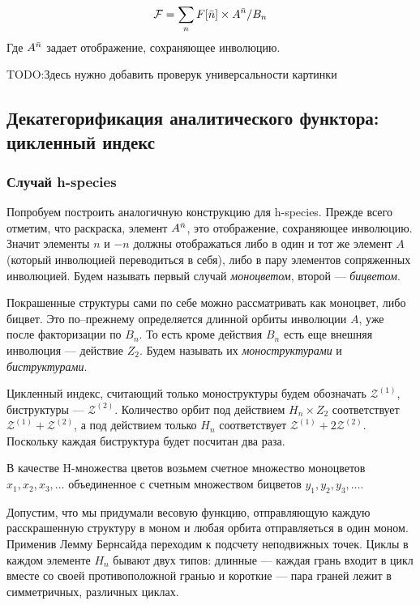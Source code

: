 \begin{equation}
\label{eq:h-an}
	\mathcal F = \sum\limits_n F[\Bar n] \times A^{\Bar n} / B_n
\end{equation}
Где $A^{\Bar n}$ задает отображение, сохраняющее инволюцию. 

TODO:Здесь нужно добавить проверук универсальности картинки

\subsection{Декатегорификация аналитического функтора: цикленный индекс} 

\subsubsection{Случай h-species}
Попробуем построить аналогичную конструкцию для h-species.
Прежде всего отметим, что раскраска, элемент $A^{\Bar n}$, это отображение,
сохраняющее инволюцию. Значит элементы $n$ и $-n$ должны отображаться либо в
один и тот же элемент $A$ (который инволюцией переводиться в себя), либо в пару
элементов сопряженных инволюцией. Будем называть первый случай
\emph{моноцветом}, второй --- \emph{бицветом}.	

Покрашенные структуры сами по себе можно рассматривать как моноцвет, либо
бицвет. Это по--прежнему определяется длинной орбиты инволюции $A$, уже
после факторизации по $B_n$. То есть кроме действия $B_n$ есть еще внешняя
инволюция --- действие $Z_2$. Будем называть их \emph{моноструктурами} и
\emph{биструктурами}.

Цикленный индекс, считающий только моноструктуры будем обозначать
$\mathcal Z^{(1)}$, биструктуры --- $\mathcal Z^{(2)}$. Количество орбит под
действием $H_n \times Z_2$ соответствует $\mathcal Z^{(1)} + \mathcal Z^{(2)}$,
а под действием только $H_n$ соответствует $\mathcal Z^{(1)} + 2\mathcal
Z^{(2)}$. Поскольку каждая биструктура будет посчитан два раза.

В качестве H-множества цветов возьмем счетное множество моноцветов $x_1, x_2,
x_3, \dots$ объединенное с счетным множеством бицветов $y_1, y_2, y_3, \dots$.

Допустим, что мы придумали весовую функцию, отправляющую каждую расскрашенную
структуру в моном и любая орбита отправляеться в один моном. Применив Лемму
Бернсайда переходим к подсчету неподвижных точек. Циклы в каждом элементе $H_n$
бывают двух типов:
длинные --- каждая грань входит в цикл вместе со своей противоположной гранью и
короткие --- пара граней лежит в симметричных, различных циклах. 

